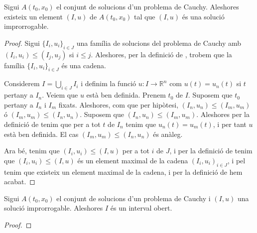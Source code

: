 \documentclass[../Apunts.tex]{subfiles}
\begin{document}
	\begin{proposition}
		\label{prop:existeixen solucions improrrogables}
		Sigui \(A(t_{0},x_{0})\) el conjunt de solucions d'un problema de Cauchy. Aleshores existeix un element \((I,u)\) de \(A(t_{0},x_{0})\) tal que \((I,u)\) és una solució improrrogable.
		\begin{proof}
			Sigui \(\{I_{i},u_{i}\}_{i\in J}\) una família de solucions del problema de Cauchy amb \((I_{i},u_{i})\leq(I_{j},u_{j})\) si \(i\leq j\). Aleshores, per la definició de , trobem que la família \(\{I_{i},u_{i}\}_{i\in J}\) és una cadena.
			
			Considerem \(I=\bigcup_{i\in J}I_{i}\) i definim la funció \(u\colon I\longrightarrow\mathbb{R}^{n}\) com \(u(t)=u_{n}(t)\) si \(t\) pertany a \(I_{n}\). Veiem que \(u\) està ben definida. Prenem \(t_{0}\) de \(I\). Suposem que \(t_{0}\) pertany a \(I_{n}\) i \(I_{m}\) fixats. Aleshores, com que per hipòtesi, \((I_{n},u_{n})\leq(I_{m},u_{m})\) ó \((I_{m},u_{m})\leq(I_{n},u_{n})\). Suposem que \((I_{n},u_{n})\leq(I_{m},u_{m})\). Aleshores per la definició de  tenim que per a tot \(t\) de \(I_{n}\) tenim que \(u_{n}(t)=u_{m}(t)\), i per tant \(u\) està ben definida. El cas \((I_{m},u_{m})\leq(I_{n},u_{n})\) és anàleg.
			
			Ara bé, tenim que \((I_{i},u_{i})\leq(I,u)\) per a tot \(i\) de \(J\), i per la definició de  tenim que \((I_{i},u_{i})\leq(I,u)\) és un element maximal de la cadena \((I_{i},u_{i})_{i\in J}\), i pel  tenim que existeix un element maximal de la cadena, i per la definició de  hem acabat.
		\end{proof}
	\end{proposition}
	\begin{proposition}
		\label{prop:les solucions improrrogables estàn definides sobre intervals oberts}
		Sigui \(A(t_{0},x_{0})\) el conjunt de solucions d'un problema de Cauchy i \((I,u)\) una solució improrrogable. Aleshores \(I\) és un interval obert.
		\begin{proof}
%
		\end{proof}
	\end{proposition}
\end{document}
